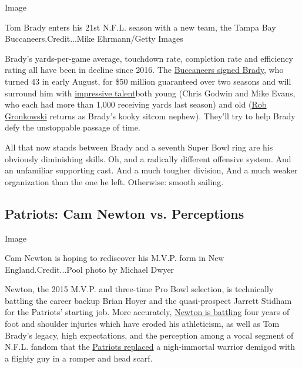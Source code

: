 Image

Tom Brady enters his 21st N.F.L. season with a new team, the Tampa Bay
Buccaneers.Credit...Mike Ehrmann/Getty Images

Brady's yards-per-game average, touchdown rate, completion rate and
efficiency rating all have been in decline since 2016. The
\href{https://www.nytimes3xbfgragh.onion/2020/03/20/sports/football/tom-brady-signed-tampa-bay.html}{Buccaneers
signed Brady}, who turned 43 in early August, for \$50 million
guaranteed over two seasons and will surround him with
\href{https://www.nytimes3xbfgragh.onion/2020/03/18/sports/football/tom-brady-tampa-bay-buccaneers.html}{impressive
talent}both young (Chris Godwin and Mike Evans, who each had more than
1,000 receiving yards last season) and old
(\href{https://www.nytimes3xbfgragh.onion/2020/04/21/sports/football/rob-gronkowski-tom-brady-buccaneers-patriots.html}{Rob
Gronkowski} returns as Brady's kooky sitcom nephew). They'll try to help
Brady defy the unstoppable passage of time.

All that now stands between Brady and a seventh Super Bowl ring are his
obviously diminishing skills. Oh, and a radically different offensive
system. And an unfamiliar supporting cast. And a much tougher division,
And a much weaker organization than the one he left. Otherwise: smooth
sailing.

\hypertarget{patriots-cam-newton-vs-perceptions}{%
\subsection{Patriots: Cam Newton vs.
Perceptions}\label{patriots-cam-newton-vs-perceptions}}

Image

Cam Newton is hoping to rediscover his M.V.P. form in New
England.Credit...Pool photo by Michael Dwyer

Newton, the 2015 M.V.P. and three-time Pro Bowl selection, is
technically battling the career backup Brian Hoyer and the
quasi-prospect Jarrett Stidham for the Patriots' starting job. More
accurately,
\href{https://www.nytimes3xbfgragh.onion/2020/07/06/sports/football/cam-newton-new-england-patriots.html}{Newton
is battling} four years of foot and shoulder injuries which have eroded
his athleticism, as well as Tom Brady's legacy, high expectations, and
the perception among a vocal segment of N.F.L. fandom that the
\href{https://www.nytimes3xbfgragh.onion/2020/06/28/sports/football/cam-newton-patriots-fine.html}{Patriots
replaced} a nigh-immortal warrior demigod with a flighty guy in a romper
and head scarf.


